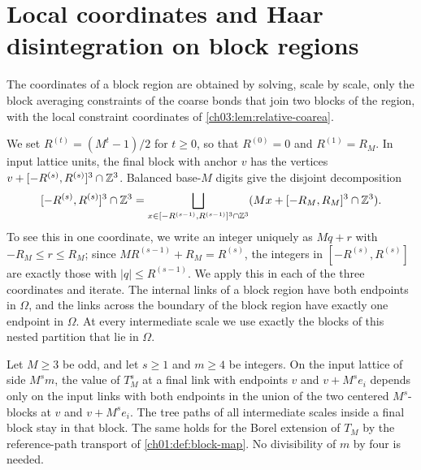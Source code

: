 \section{Local coordinates and Haar disintegration on block regions}\label{ch15:sec:coordinates}

The coordinates of a block region are obtained by solving, scale by scale, only the block averaging constraints of the coarse bonds that join two blocks of the region, with the local constraint coordinates of \cref{ch03:lem:relative-coarea}.

We set $R^{(t)}=(M^t-1)/2$ for $t\ge0$, so that $R^{(0)}=0$ and $R^{(1)}=R_M$. In input lattice units, the final block with anchor $v$ has the vertices $v+[-R^{(s)},R^{(s)}]^3\cap\mathbb Z^3$. Balanced base-$M$ digits give the disjoint decomposition
\begin{equation}\label{ch15:eq:balanced-nesting}
 [-R^{(s)},R^{(s)}]^3\cap\mathbb Z^3
 =\bigsqcup_{x\in[-R^{(s-1)},R^{(s-1)}]^3\cap\mathbb Z^3}
       (Mx+[-R_M,R_M]^3\cap\mathbb Z^3).
\end{equation}
To see this in one coordinate, we write an integer uniquely as $Mq+r$ with $-R_M\le r\le R_M$; since $MR^{(s-1)}+R_M=R^{(s)}$, the integers in $[-R^{(s)},R^{(s)}]$ are exactly those with $|q|\le R^{(s-1)}$. We apply this in each of the three coordinates and iterate. The internal links of a block region have both endpoints in $\Omega$, and the links across the boundary of the block region have exactly one endpoint in $\Omega$. At every intermediate scale we use exactly the blocks of this nested partition that lie in $\Omega$.

\begin{lemma}\label{ch15:lem:local-endpoint-dependence}
Let $M\ge3$ be odd, and let $s\ge1$ and $m\ge4$ be integers. On the input lattice of side $M^sm$, the value of $T_M^s$ at a final link with endpoints $v$ and $v+M^se_i$ depends only on the input links with both endpoints in the union of the two centered $M^s$-blocks at $v$ and $v+M^se_i$. The tree paths of all intermediate scales inside a final block stay in that block. The same holds for the Borel extension of $T_M$ by the reference-path transport of \cref{ch01:def:block-map}. No divisibility of $m$ by four is needed.
\end{lemma}

